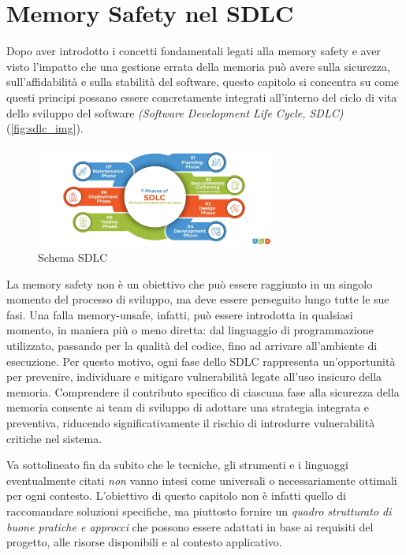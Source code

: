 \chapter{Memory Safety nel SDLC}
\label{cha:sdlc}

Dopo aver introdotto i concetti fondamentali legati alla memory safety e aver
visto l'impatto che una gestione errata della memoria può avere sulla sicurezza,
sull'affidabilità e sulla stabilità del software, questo capitolo si concentra
su come questi principi possano essere concretamente integrati all'interno del
ciclo di vita dello sviluppo del software \textit{(Software Development Life Cycle,
SDLC)}(\autoref{fig:sdlc_img}).

\begin{figure}[htbp]
  \centering
  \includegraphics[width=0.7\textwidth]{images/sdlc.png}
  \caption[Schema SDLC]{Schema SDLC\protect\footnotemark}
  \label{fig:sdlc_img}
\end{figure}

La memory safety non è un obiettivo che può essere raggiunto in un singolo
momento del processo di sviluppo, ma deve essere perseguito lungo tutte le sue fasi.
Una falla memory-unsafe, infatti, può essere introdotta in qualsiasi momento, in
maniera più o meno diretta: dal linguaggio di programmazione utilizzato, passando
per la qualità del codice, fino ad arrivare all'ambiente di esecuzione. Per questo
motivo, ogni fase dello SDLC rappresenta un'opportunità per prevenire, individuare
e mitigare vulnerabilità legate all'uso insicuro della memoria. Comprendere il
contributo specifico di ciascuna fase alla sicurezza della memoria consente ai
team di sviluppo di adottare una strategia integrata e preventiva, riducendo significativamente
il rischio di introdurre vulnerabilità critiche nel sistema.

Va sottolineato fin da subito che le tecniche, gli strumenti e i linguaggi
eventualmente citati \textit{non} vanno intesi come universali o necessariamente
ottimali per ogni contesto. L'obiettivo di questo capitolo non è infatti quello
di raccomandare soluzioni specifiche, ma piuttosto fornire un \textit{quadro
strutturato di buone pratiche e approcci} che possono essere adattati in base ai
requisiti del progetto, alle risorse disponibili e al contesto applicativo.





